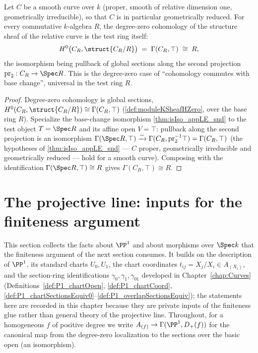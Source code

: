 \begin{theorem}
  \label{thm:relStructureSectionsTop}
  \leanok
  Let \(C\) be a smooth curve over \(k\) (proper, smooth of relative dimension one, geometrically
  irreducible), so that \(C\) is in particular geometrically reduced. For every commutative
  \(k\)-algebra \(R\), the degree-zero cohomology of the structure sheaf of the relative curve is
  the test ring itself:
  \[
    H^0\bigl(C_R, \struct{C_R/R}\bigr) \;=\; \Gamma(C_R, \top) \;\cong\; R,
  \]
  the isomorphism being pullback of global sections along the second projection
  \(\mathrm{pr}_2 : C_R \to \Spec R\). This is the degree-zero case of ``cohomology commutes with
  base change'', universal in the test ring \(R\).
\end{theorem}
\begin{proof}
  \leanok
  Degree-zero cohomology is global sections, \(H^0(C_R, \struct{C_R/R}) \cong \Gamma(C_R, \top)\)
  (\ref{def:moduleKSheafHZero}, over the base ring \(R\)). Specialize the base-change isomorphism
  \ref{thm:isIso_appLE_snd} to the test object \(T = \Spec R\) and its affine open \(V = \top\):
  pullback along the second projection is an isomorphism
  \(\Gamma(\Spec R, \top) \xrightarrow{\sim} \Gamma(C_R, \mathrm{pr}_2^{-1}\top) = \Gamma(C_R, \top)\)
  (the hypotheses of \ref{thm:isIso_appLE_snd} --- \(C\) proper, geometrically irreducible and
  geometrically reduced --- hold for a smooth curve). Composing with the identification
  \(\Gamma(\Spec R, \top) \cong R\) gives \(\Gamma(C_R, \top) \cong R\).
\end{proof}

\section{The projective line: inputs for the finiteness argument}

This section collects the facts about \(\PP^1\) and about morphisms over \(\Spec k\) that
the finiteness argument of the next section consumes. It builds on the description of
\(\PP^1\), its standard charts \(U_0, U_1\), the chart coordinates
\(t_{ij} = X_j/X_i \in A_{(X_i)}\), and the section-ring identifications
\(\gamma_0, \gamma_1, \gamma_{01}\) developed in Chapter~\ref{chap:Curves}
(Definitions~\ref{def:P1_chartOpen}, \ref{def:P1_chartCoord},
\ref{def:P1_chartSectionsEquiv0}--\ref{def:P1_overlapSectionsEquiv}); the statements here
are recorded in this chapter because they are private inputs of the finiteness glue rather
than general theory of the projective line. Throughout, for a homogeneous \(f\) of positive
degree we write \(A_{(f)} \to \Gamma(\PP^1, D_+(f))\) for the canonical map from the
degree-zero localization to the sections over the basic open (an isomorphism).

